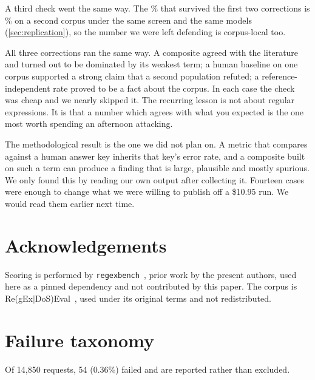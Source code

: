 \documentclass[11pt]{article}
\begin{document}
A third check went the same way. The \vulngivencorrect{}\% that survived the first two
corrections is \srvulngivencorrect{}\% on a second corpus under the same screen and the same
models (\cref{sec:replication}), so the number we were left defending is
corpus-local too.

All three corrections ran the same way. A composite agreed with the
literature and turned out to be dominated by its weakest term; a human
baseline on one corpus supported a strong claim that a second population
refuted; a reference-independent rate proved to be a fact about the corpus.
In each case the check was cheap and we nearly skipped it. The recurring
lesson is not about regular expressions. It is that a number which agrees
with what you expected is the one most worth spending an afternoon
attacking.

The methodological result is the one we did not plan on. A metric that
compares against a human answer key inherits that key's error rate, and a
composite built on such a term can produce a finding that is large, plausible
and mostly spurious. We only found this by reading our own output after
collecting it. Fourteen cases were enough to change what we were willing to
publish off a \$10.95 run. We would read them earlier next time.

\section*{Acknowledgements}

Scoring is performed by \texttt{regexbench}~\citep{regexbench}, prior work by
the present authors, used here as a pinned dependency and not contributed by
this paper. The corpus is Re(gEx$|$DoS)Eval~\citep{siddiq2024regexeval}, used under its
original terms and not redistributed.




\appendix

\section{Failure taxonomy}
\label{app:failures}

Of 14{,}850 requests, 54 (0.36\%) failed and are reported rather than
excluded.
\end{document}
